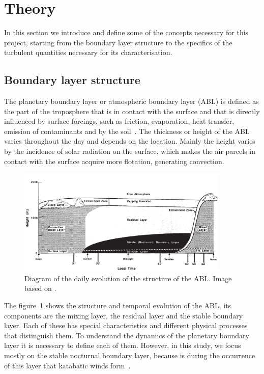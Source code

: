 \documentclass[a4paper,12pt]{article}
\begin{document}
\section{Theory}

In this section we introduce and define some of the concepts necessary for this project, starting from the boundary layer structure to the specifics of the turbulent quantities necessary for its characterisation.

\subsection{Boundary layer structure}
The planetary boundary layer or atmospheric boundary layer (ABL) is defined as the part of the troposphere that is in contact with the surface and that is directly influenced by surface forcings, such as friction, evaporation, heat transfer, emission of contaminants and by the soil~\citep{stull2012introduction}. The thickness or height of the ABL varies throughout the day and depends on the location. Mainly the height varies by the incidence of solar radiation on the surface, which makes the air parcels in contact with the surface acquire more flotation, generating convection.

\begin{figure}[ht!]
	\vspace{-5pt}
    \centering
\includegraphics[width=0.9\textwidth]{fig/abl_stull.png}
    \caption{Diagram of the daily evolution of the structure of the ABL. Image based on \cite{stull2012introduction}.}
    \label{fig:ABL_structure}
  \vspace{-5pt}
\end{figure}

The figure~\ref{fig:ABL_structure} shows the structure and temporal evolution of the ABL, its components are the mixing layer, the residual layer and the stable boundary layer. Each of these has special characteristics and different physical processes that distinguish them. To understand the dynamics of the planetary boundary layer it is necessary to define each of them. However, in this study, we focus mostly on the stable nocturnal boundary layer, because is during the occurrence of this layer that katabatic winds form~\citep{poulos2008observational, stull2012introduction}.
\end{document}
